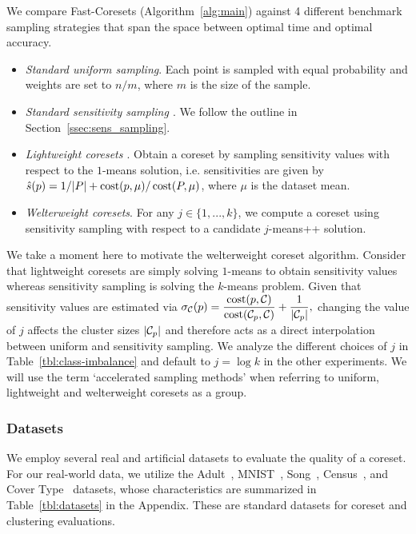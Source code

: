 We compare Fast-Coresets (Algorithm~\ref{alg:main}) against 4 different benchmark sampling strategies that span the space between optimal time and optimal
accuracy.
\begin{itemize}
        \item \emph{Standard uniform sampling}. Each point is sampled with equal probability and weights are set to $n / m$, where $m$ is the size of the sample.
        \item \emph{Standard sensitivity sampling \cite{LS10}}. We follow the outline in Section~\ref{ssec:sens_sampling}.
        \item \emph{Lightweight coresets \cite{bachem2018scalable}}. Obtain a coreset by sampling sensitivity values with respect to the $1$-means solution,
            i.e. sensitivities are given by $\hat{s}(p) = 1/|P| + \operatorname{cost}(p, \mu) / \operatorname{cost}(P, \mu)$, where $\mu$ is the dataset mean.
        \item \emph{Welterweight coresets}. For any $j \in \{1,..., k\}$, we compute a coreset using sensitivity sampling with respect to a candidate
            $j$-means++ solution.
\end{itemize}

We take a moment here to motivate the welterweight coreset algorithm.  Consider that lightweight coresets are simply solving $1$-means to obtain sensitivity
values whereas sensitivity sampling is solving the $k$-means problem. Given that sensitivity values are estimated via $ \sigma_\mathcal C(p) = \dfrac{\operatorname{cost}(p,
\mathcal C)}{\operatorname{cost}(\mathcal C_{p}, \mathcal C)} + \dfrac{1}{|\mathcal C_p|},$ changing the value of $j$ affects the cluster sizes $|\mathcal C_p|$ and therefore acts as a direct
interpolation between uniform and sensitivity sampling.  We analyze the different choices of $j$ in Table~\ref{tbl:class-imbalance} and default to $j = \log k$
in the other experiments. We will use the term `accelerated sampling methods' when referring to uniform, lightweight and welterweight coresets as a group.

\subsubsection{Datasets}
\label{sssec:datasets}

We employ several real and artificial datasets to evaluate the quality of a coreset.  For our real-world data, we utilize the Adult~\cite{Dua:2019},
MNIST~\cite{mnist}, Song~\cite{song}, Census~\cite{census}, and Cover Type~\cite{covtype} datasets, whose characteristics are summarized in
Table~\ref{tbl:datasets} in the Appendix. These are standard datasets for coreset and clustering evaluations.


